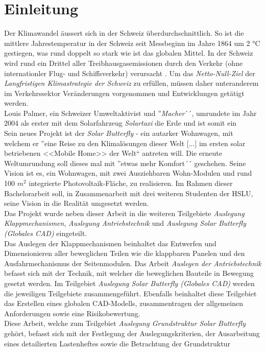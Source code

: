 \section{Einleitung}
Der Klimawandel äussert sich in der Schweiz überdurchschnittlich. So ist die mittlere Jahrestemperatur in der Schweiz seit Messbeginn im Jahre 1864 um 2 °C gestiegen, was rund doppelt so stark wie ist das globalen Mittel. In der Schweiz wird rund ein Drittel aller Treibhausgasemissionen durch den Verkehr (ohne internationler Flug- und Schiffsverkehr) verursacht \cite{BAFU}. Um das \emph{Netto-Null-Ziel} der \emph{Langfristigen Klimastrategie der Schweiz} zu erfüllen, müssen daher unteranderem im Verkehrssektor Veränderungen vorgenommen und Entwicklungen getätigt werden.\\
Louis Palmer, ein Schweizer Umweltaktivist und ''\emph{Macher}´´,  umrundete im Jahr 2004 als erster mit dem Solarfahrzeug \emph{Solartaxi} die Erde und ist somit ein \\
Sein neues Projekt ist der \emph{Solar Butterfly} - ein autarker Wohnwagen, mit welchem er ''eine Reise zu den Klimalösungen dieser Welt [...] im ersten solar betriebenen <<Mobile Home>> der Welt`` antreten will. Die erneute Weltumrundung soll dieses mal mit ''etwas mehr Komfort´´ geschehen. Seine Vision ist es, ein Wohnwagen, mit zwei Ausziehbaren Wohn-Modulen und rund 100 $m^2$ integrierte Photovoltaik-Fläche, zu realisieren. Im Rahmen dieser Bachelorarbeit soll, in Zusammenarbeit mit drei weiteren Studenten der HSLU, seine Vision in die Realität umgesetzt werden.\\
Das Projekt wurde neben dieser Arbeit in die weiteren Teilgebiete \emph{Auslegung Klappmechanismen}, \emph{Auslegung Antriebstechnik} und \emph{Auslegung Solar Butterfly (Globales CAD)} eingeteilt.\\
Das Auslegen der Klappmechanismen beinhaltet das Entwerfen und Dimensionieren aller beweglichen Teilen wie die klappbaren Panelen und den Ausfahrmechanismus der Seitenmodulen. Das Arbeit \emph{Auslegen der Antriebstechnik} befasst sich mit der Technik, mit welcher die beweglichen Bauteile in Bewegung gesetzt werden. Im Teilgebiet \emph{Auslegung Solar Butterfly (Globales CAD)} werden die jeweiligen Teilgebiete zusammengeführt. Ebenfalls beinhaltet diese Teilgebiet das Erstellen eines globalen CAD-Modells, zusammentragen der allgemeinen Anforderungen sowie eine Risikobewertung.\\
Diese Arbeit, welche zum Teilgebiet \emph{Auslegung Grundstruktur Solar Butterfly} gehört, befasst sich mit der Festlegung der Auslegungskriterien, der Ausarbeitung eines detailierten Lastenheftes sowie die Betrachtung der Grundstruktur

